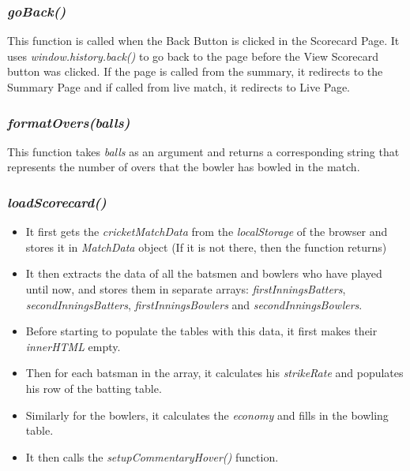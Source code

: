 \documentclass[a4paper,12pt]{article}
\begin{document}
\subsubsection{\textit{goBack()}}
This function is called when the Back Button is clicked in the Scorecard Page.
It uses \textit{window.history.back()} to go back to the page before the View Scorecard button was clicked.
If the page is called from the summary, it redirects to the Summary Page and if called from live match, it redirects to Live Page.

\subsubsection{\textit{formatOvers(balls)}}
This function takes \textit{balls} as an argument and returns a corresponding string that represents the number of overs that the bowler has bowled in the match.

\subsubsection{\textit{loadScorecard()}}
\begin{itemize}
\item It first gets the \textit{cricketMatchData} from the \textit{localStorage} of the browser and stores it in \textit{MatchData} object (If it is not there, then the function returns)
\item It then extracts the data of all the batsmen and bowlers who have played until now, and stores them in separate arrays: \textit{firstInningsBatters}, \textit{secondInningsBatters}, \textit{firstInningsBowlers} and \textit{secondInningsBowlers}.
\item Before starting to populate the tables with this data, it first makes their \textit{innerHTML} empty.
\item Then for each batsman in the array, it calculates his \textit{strikeRate} and populates his row of the batting table.
\item Similarly for the bowlers, it calculates the \textit{economy} and fills in the bowling table.
\item It then calls the \textit{setupCommentaryHover()} function. 
\end{itemize}
\end{document}
